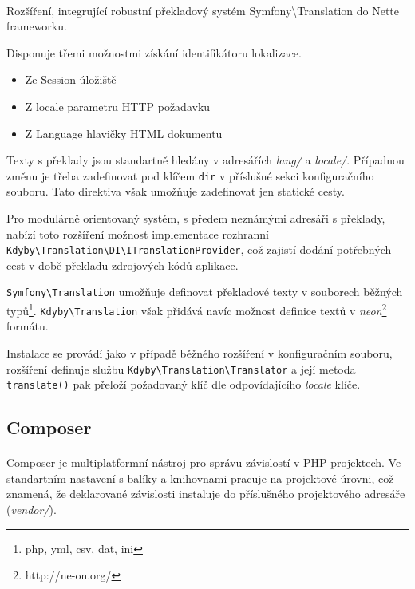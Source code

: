 \documentclass[11pt,oneside]{fithesis}
\begin{document}
        \paragraph*{}
        Rozšíření, integrující robustní překladový systém Symfony\textbackslash Translation do Nette frameworku.

        Disponuje třemi možnostmi získání identifikátoru lokalizace.
        \begin{itemize}
        \item Ze Session úložiště
        \item Z locale parametru HTTP požadavku
        \item Z Language hlavičky HTML dokumentu
        \end{itemize}

        Texty s překlady jsou standartně hledány v adresářích \textit{lang/} a \textit{locale/}. Případnou změnu je třeba zadefinovat pod klíčem \verb|dir| v příslušné sekci konfiguračního souboru. Tato direktiva však umožňuje zadefinovat jen statické cesty.

        Pro modulárně orientovaný systém, s předem neznámými adresáři s překlady, nabízí toto rozšíření možnost implementace rozhranní\\ \verb|Kdyby\Translation\DI\ITranslationProvider|, což zajistí dodání potřebných cest v době překladu zdrojových kódů aplikace.

        \verb|Symfony\Translation| umožňuje definovat překladové texty v souborech běžných typů\footnote{php, yml, csv, dat, ini}. \verb|Kdyby\Translation| však přidává navíc možnost definice textů v  \textit{neon}\footnote{http://ne-on.org/} formátu.

        Instalace se provádí jako v případě běžného rozšíření v konfiguračním souboru, rozšíření definuje službu \verb|Kdyby\Translation\Translator| a její metoda \verb|translate()| pak přeloží požadovaný klíč dle odpovídajícího \textit{locale} klíče.

        \subsection{Composer}
        \paragraph*{}
        Composer je multiplatformní nástroj pro správu závislostí v PHP projektech. Ve standartním nastavení s balíky a knihovnami pracuje na projektové úrovni, což znamená, že deklarované závislosti instaluje do příslušného projektového adresáře (\textit{vendor/}). 
\end{document}
